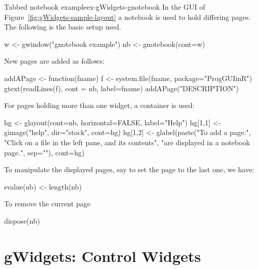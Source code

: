 \begin{example}{Tabbed notebook example}{ex-gWidgets-gnotebook}
 In the GUI of Figure~\ref{fig:gWidgets-sample-layout} a notebook is
 used to hold differing pages. The following is the basic setup used.
\begin{Schunk}
\begin{Sinput}
 w <- gwindow("gnotebook example")
 nb <- gnotebook(cont=w)
\end{Sinput}
\end{Schunk}

New pages are added as follows:
\begin{Schunk}
\begin{Sinput}
 addAPage <- function(fname) {
   f <- system.file(fname, package="ProgGUIinR")
   gtext(readLines(f), cont = nb, label=fname)
 }
 addAPage("DESCRIPTION")
\end{Sinput}
\end{Schunk}

For pages holding more than one widget, a container is used:
\begin{Schunk}
\begin{Sinput}
 hg <- glayout(cont=nb, horizontal=FALSE, label="Help")
 hg[1,1] <- gimage("help", dir="stock", cont=hg)
 hg[1,2] <- glabel(paste("To add a page:",
            "Click on a file in the left pane, and its contents",
            "are displayed in a notebook page.", sep="\n"), 
            cont=hg)
\end{Sinput}
\end{Schunk}


To manipulate the displayed pages, say to set the page to the last one,
we have:
\begin{Schunk}
\begin{Sinput}
 svalue(nb) <- length(nb)
\end{Sinput}
\end{Schunk}
%
To remove the current page
\begin{Schunk}
\begin{Sinput}
 dispose(nb)
\end{Sinput}
\end{Schunk}
%
\end{example}






\chapter{gWidgets: Control Widgets}
\label{cha:control-widgets}

